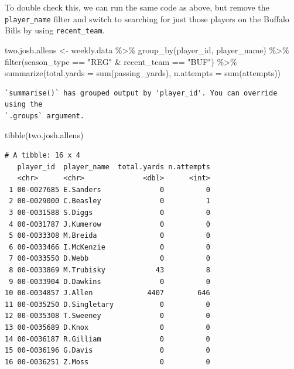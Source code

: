 \documentclass[
  letterpaper,
]{krantz}
\newenvironment{Shaded}{\begin{snugshade}}{\end{snugshade}}
\newcommand{\AttributeTok}[1]{\textcolor[rgb]{0.40,0.45,0.13}{#1}}
\newcommand{\FunctionTok}[1]{\textcolor[rgb]{0.28,0.35,0.67}{#1}}
\newcommand{\NormalTok}[1]{\textcolor[rgb]{0.00,0.23,0.31}{#1}}
\newcommand{\OtherTok}[1]{\textcolor[rgb]{0.00,0.23,0.31}{#1}}
\newcommand{\SpecialCharTok}[1]{\textcolor[rgb]{0.37,0.37,0.37}{#1}}
\newcommand{\StringTok}[1]{\textcolor[rgb]{0.13,0.47,0.30}{#1}}
\begin{document}
To double check this, we can run the same code as above, but remove the
\texttt{player\_name} filter and switch to searching for just those
players on the Buffalo Bills by using \texttt{recent\_team}.

\begin{Shaded}
\begin{Highlighting}[]
\NormalTok{two.josh.allens }\OtherTok{\textless{}{-}}\NormalTok{ weekly.data }\SpecialCharTok{\%\textgreater{}\%}
  \FunctionTok{group\_by}\NormalTok{(player\_id, player\_name) }\SpecialCharTok{\%\textgreater{}\%}
  \FunctionTok{filter}\NormalTok{(season\_type }\SpecialCharTok{==} \StringTok{"REG"} \SpecialCharTok{\&}\NormalTok{ recent\_team }\SpecialCharTok{==} \StringTok{"BUF"}\NormalTok{) }\SpecialCharTok{\%\textgreater{}\%}
  \FunctionTok{summarize}\NormalTok{(}\AttributeTok{total.yards =} \FunctionTok{sum}\NormalTok{(passing\_yards),}
            \AttributeTok{n.attempts =} \FunctionTok{sum}\NormalTok{(attempts))}
\end{Highlighting}
\end{Shaded}

\begin{verbatim}
`summarise()` has grouped output by 'player_id'. You can override using the
`.groups` argument.
\end{verbatim}

\begin{Shaded}
\begin{Highlighting}[]
\FunctionTok{tibble}\NormalTok{(two.josh.allens)}
\end{Highlighting}
\end{Shaded}

\begin{verbatim}
# A tibble: 16 x 4
   player_id  player_name  total.yards n.attempts
   <chr>      <chr>              <dbl>      <int>
 1 00-0027685 E.Sanders              0          0
 2 00-0029000 C.Beasley              0          1
 3 00-0031588 S.Diggs                0          0
 4 00-0031787 J.Kumerow              0          0
 5 00-0033308 M.Breida               0          0
 6 00-0033466 I.McKenzie             0          0
 7 00-0033550 D.Webb                 0          0
 8 00-0033869 M.Trubisky            43          8
 9 00-0033904 D.Dawkins              0          0
10 00-0034857 J.Allen             4407        646
11 00-0035250 D.Singletary           0          0
12 00-0035308 T.Sweeney              0          0
13 00-0035689 D.Knox                 0          0
14 00-0036187 R.Gilliam              0          0
15 00-0036196 G.Davis                0          0
16 00-0036251 Z.Moss                 0          0
\end{verbatim}
\end{document}
